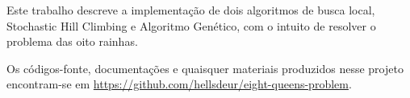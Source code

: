 Este trabalho descreve a implementação de dois algoritmos de busca local, Stochastic Hill Climbing e Algoritmo Genético, com o intuito de resolver o problema das oito rainhas. 

Os códigos-fonte, documentações e quaisquer materiais produzidos nesse projeto encontram-se em \href{https://github.com/hellsdeur/eight-queens-problem}{https://github.com/hellsdeur/eight-queens-problem}.